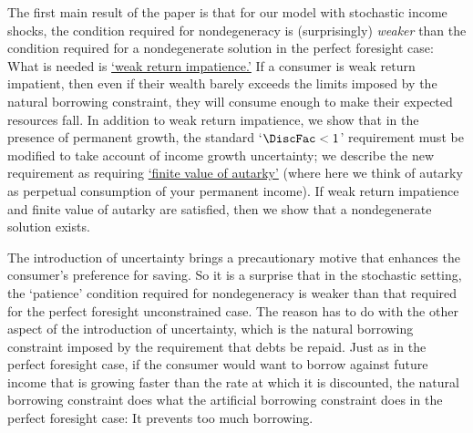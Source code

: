 \documentclass[BufferStockTheory]{subfiles}
\begin{document}
The first main result of the paper is that for our model with stochastic income shocks, the condition required for nondegeneracy is (surprisingly) \textit{weaker} than the condition required for a nondegenerate solution in the perfect foresight case: What is needed is \hyperlink{WRIC}{`weak return impatience.'} If a consumer is weak return impatient, then even if their wealth barely exceeds the limits imposed by the natural borrowing constraint, they will consume enough to make their expected resources fall.
In addition to weak return impatience, we show that in the presence of permanent growth, the standard `$\DiscFac<1$' requirement must be modified to take account of income growth uncertainty; we describe the new requirement as requiring \hyperlink{FVAC}{`finite value of autarky'} (where here we think of autarky as perpetual consumption of your permanent income).
If weak return impatience and finite value of autarky are satisfied, then we show that a nondegenerate solution  exists.


The introduction of uncertainty brings a precautionary motive that enhances the consumer's preference for saving.
So it is a surprise that in the stochastic setting, the `patience' condition required for nondegeneracy is weaker than that required for the perfect foresight unconstrained case.
The reason has to do with the other aspect of the introduction of uncertainty, which is the natural borrowing constraint imposed by the requirement that debts be repaid.
Just as in the perfect foresight case, if the consumer would want to borrow against future income that is growing faster than the rate at which it is discounted, the natural borrowing constraint does what the artificial borrowing constraint does in the perfect foresight case: It prevents too much borrowing.

% 

% 
\end{document}
